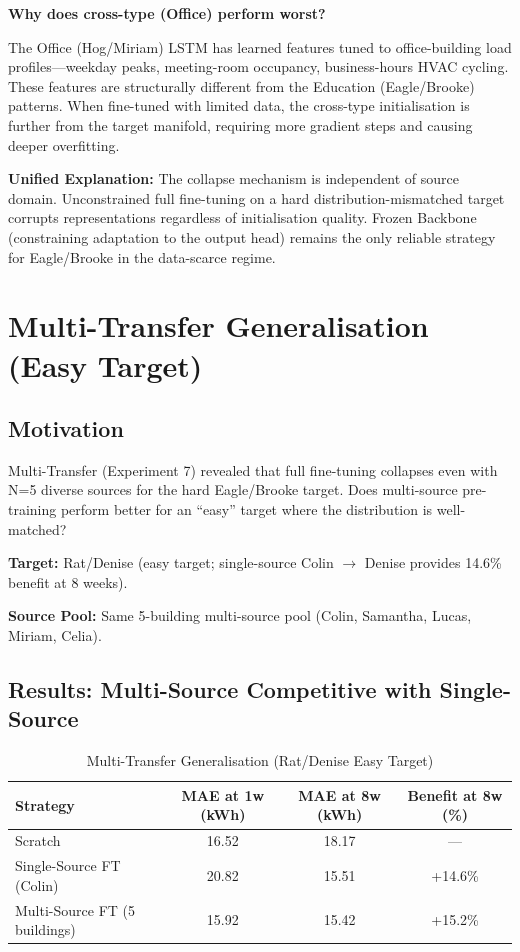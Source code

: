 \documentclass[12pt,a4paper]{report}
\begin{document}
\textbf{Why does cross-type (Office) perform worst?}

The Office (Hog/Miriam) LSTM has learned features tuned to office-building load profiles---weekday peaks, meeting-room occupancy, business-hours HVAC cycling. These features are structurally different from the Education (Eagle/Brooke) patterns. When fine-tuned with limited data, the cross-type initialisation is further from the target manifold, requiring more gradient steps and causing deeper overfitting.

\textbf{Unified Explanation:} The collapse mechanism is independent of source domain. Unconstrained full fine-tuning on a hard distribution-mismatched target corrupts representations regardless of initialisation quality. Frozen Backbone (constraining adaptation to the output head) remains the only reliable strategy for Eagle/Brooke in the data-scarce regime.

\section{Multi-Transfer Generalisation (Easy Target)}

\subsection{Motivation}

Multi-Transfer (Experiment 7) revealed that full fine-tuning collapses even with N=5 diverse sources for the hard Eagle/Brooke target. Does multi-source pre-training perform better for an ``easy'' target where the distribution is well-matched?

\textbf{Target:} Rat/Denise (easy target; single-source Colin $\to$ Denise provides 14.6\% benefit at 8 weeks).

\textbf{Source Pool:} Same 5-building multi-source pool (Colin, Samantha, Lucas, Miriam, Celia).

\subsection{Results: Multi-Source Competitive with Single-Source}

\begin{table}[H]
\centering
\caption{Multi-Transfer Generalisation (Rat/Denise Easy Target)}
\small
\begin{tabular}{lccc}
\toprule
\textbf{Strategy} & \textbf{MAE at 1w (kWh)} & \textbf{MAE at 8w (kWh)} & \textbf{Benefit at 8w (\%)} \\
\midrule
Scratch & 16.52 & 18.17 & --- \\
Single-Source FT (Colin) & 20.82 & 15.51 & +14.6\% \\
Multi-Source FT (5 buildings) & 15.92 & 15.42 & +15.2\% \\
\bottomrule
\end{tabular}
\end{table}
\end{document}
